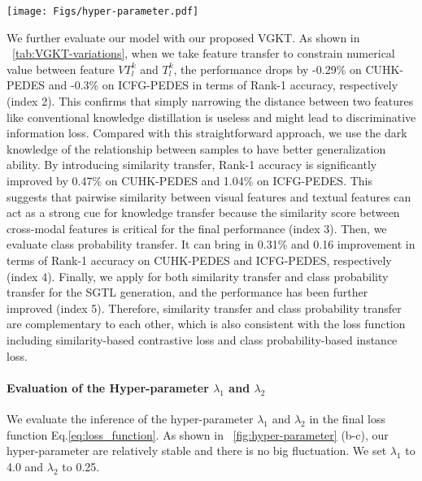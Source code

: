 \begin{figure*}[t]
	\centering
	\texttt{[image: Figs/hyper-parameter.pdf]}
	\caption{\small{Effects of three hyper-parameters, group number $K$, $\mathcal{L}_{st}$ weight $\lambda_1$, and $\mathcal{L}_{cpt}$ weight $\lambda_2$ on CUHK-PEDES and ICFG-PEDES datasets in terms of Rank-1 accuracy. 
}}
	\label{fig:hyper-parameter}
\end{figure*}

We further evaluate our model with our proposed VGKT. As shown in \tablename~\ref{tab:VGKT-variations}, when we take feature transfer to constrain numerical value between feature $VT_l^k$ and $T_l^k$, the performance drops by -0.29\% on CUHK-PEDES and -0.3\% on ICFG-PEDES in terms of Rank-1 accuracy, respectively (index 2). This confirms that simply narrowing the distance between two features like 
conventional knowledge distillation is useless and might lead to discriminative information loss. 
Compared with this straightforward approach, we use the dark knowledge of the relationship between samples to have better generalization ability.
By introducing similarity transfer, Rank-1 accuracy is significantly improved by 0.47\% on CUHK-PEDES and 1.04\% on ICFG-PEDES. This suggests that pairwise similarity between visual features and textual features can act as a strong cue for knowledge transfer because the similarity score between cross-modal features is critical for the final performance (index 3).
Then, we evaluate class probability transfer. It can bring in 0.31\% and 0.16 improvement in terms of Rank-1 accuracy on CUHK-PEDES and ICFG-PEDES, respectively (index 4). 
Finally, we apply for both similarity transfer and class probability transfer for the SGTL generation, and the performance has been further improved (index 5).
Therefore, similarity transfer and class probability transfer are complementary to each other, which is also consistent with the loss function including similarity-based contrastive loss and class probability-based instance loss.

\paragraph{Evaluation of the Hyper-parameter $\lambda_1$ and $\lambda_2$}
We evaluate the inference of the hyper-parameter $\lambda_1$ and $\lambda_2$ in the final loss function Eq.\ref{eq:loss_function}. As shown in \figurename~\ref{fig:hyper-parameter} (b-c), our hyper-parameter are relatively stable and there is no big fluctuation. We set $\lambda_1$ to 4.0 and $\lambda_2$ to 0.25. 






